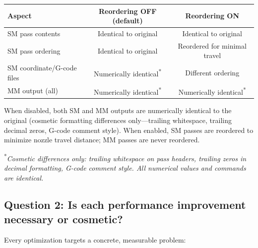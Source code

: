 \documentclass[11pt,a4paper]{article}
\begin{document}
\begin{center}
\begin{tabular}{lcc}
\toprule
\textbf{Aspect} & \textbf{Reordering OFF (default)} & \textbf{Reordering ON} \\
\midrule
SM pass contents & Identical to original & Identical to original \\
SM pass ordering & Identical to original & Reordered for minimal travel \\
SM coordinate/G-code files & Numerically identical\textsuperscript{*} & Different ordering \\
MM output (all) & Numerically identical\textsuperscript{*} & Numerically identical\textsuperscript{*} \\
\bottomrule
\end{tabular}
\end{center}

When disabled, both SM and MM outputs are numerically identical to the original (cosmetic formatting differences only---trailing whitespace, trailing decimal zeros, G-code comment style). When enabled, SM passes are reordered to minimize nozzle travel distance; MM passes are never reordered.

\textsuperscript{*}\textit{Cosmetic differences only: trailing whitespace on pass headers, trailing zeros in decimal formatting, G-code comment style. All numerical values and commands are identical.}

\subsection{Question 2: Is each performance improvement necessary or cosmetic?}

Every optimization targets a concrete, measurable problem:
\end{document}
